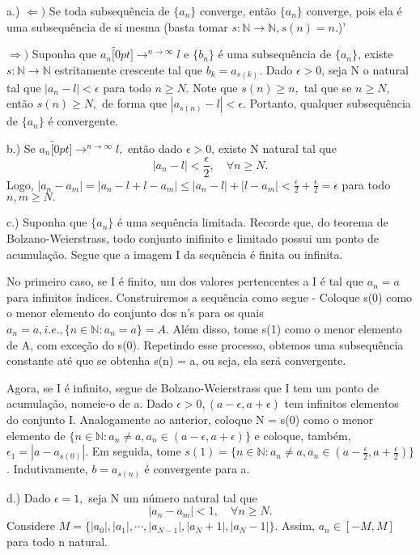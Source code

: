 \documentclass[analysis_notes.tex]{subfiles}
\begin{document}
\begin{proof*}
	a.) $\Leftarrow)$ Se toda subsequência de $\{a_{n}\}$ converge, ent\~ao $\{a_{n}\}$ converge, pois ela é uma subsequ\^encia de si mesma (basta tomar $s:\mathbb{N}\rightarrow \mathbb{N}, s(n) = n.$)'

	$\Rightarrow)$ Suponha que $a_{n}\overbracket[0pt]{\longrightarrow}^{n\to \infty}l$ e $\{b_{n}\}$ é uma subsequência de $\{a_{n}\}$, existe
	$s:\mathbb{N}\rightarrow \mathbb{N}$ estritamente crescente tal que $b_{k} = a_{s(k)}.$ Dado $\epsilon > 0$, seja N o natural tal que
	$|a_{n} - l| < \epsilon$ para todo $n\geq{N}.$ Note que $s(n)\geq{n},$ tal que se $n\geq{N},$ ent\~ao $s(n)\geq{N},$ de forma que
	$|a_{s(n)} - l| < \epsilon$. Portanto, qualquer subsequência de $\{a_{n}\}$ é convergente.

	b.) Se $a_{n}\overbracket[0pt]{\longrightarrow}^{n\to \infty}l,$ ent\~ao dado $\epsilon > 0$, existe N natural tal que
	$$
		|a_{n}-l|<\frac{\epsilon}{2},\quad\forall n\geq{N}.
	$$
	Logo, $|a_{n}-a_{m}| = |a_{n}-l + l-a_{m}| \leq{|a_{n}-l| + |l-a_{m}|} < \frac{\epsilon}{2} + \frac{\epsilon}{2} = \epsilon$ para todo $n, m \geq{N}.$

	c.) Suponha que $\{a_{n}\}$ é uma sequência limitada. Recorde que, do teorema de Bolzano-Weierstrass, todo conjunto inifinito e limitado
	possui um ponto de acumula\c c\~ao. Segue que a imagem I da sequência é finita ou infinita.

	No primeiro caso, se I é finito, um dos valores pertencentes a I \'e tal que $a_{n} = a$ para infinitos \'indices.
	Construiremos a sequência como segue - Coloque s(0) como o menor elemento do conjunto dos n's para os quais
	$a_{n} = a, i.e.,\{n\in \mathbb{N}: a_{n} = a\} = A. $ Além disso, tome s(1) como  o menor elemento de A, com  exce\c c\~ao do
	s(0). Repetindo esse processo, obtemos uma subsequência constante até que se obtenha s(n) = a, ou seja, ela ser\'a convergente.

	Agora, se I é infinito, segue de Bolzano-Weierstrass que I tem um ponto de acumula\c c\~ao, nomeie-o de a. Dado $\epsilon > 0, (a-\epsilon, a+\epsilon)$
	tem infinitos elementos do conjunto I. Analogamente ao anterior, coloque N = s(0) como o menor elemento de $\{n\in \mathbb{N}: a_{n}\neq a, a_{n}\in(a-\epsilon, a+\epsilon)\}$ e coloque, também,
	$\epsilon_{1} = |a-a_{s(0)}|$. Em seguida, tome $s(1) = \{n\in \mathbb{N}: a_{n}\neq a, a_{n}\in(a-\frac{\epsilon}{2}, a+\frac{\epsilon}{2})\}$. Indutivamente,
	$b = a_{s(n)}$ é convergente para a.

	d.) Dado $\epsilon = 1,$ seja N um n\'umero natural tal que
	$$
		|a_{n}-a_{m}| < 1,\quad\forall n\geq{N}.
	$$
	Considere $M = \{|a_{0}|, |a_{1}|, \cdots, |a_{N-1}|, |a_{N}+1|, |a_{N}-1|\}.$ Assim, $a_{n}\in[-M, M]$ para todo n natural.


\end{proof*}
\end{document}
